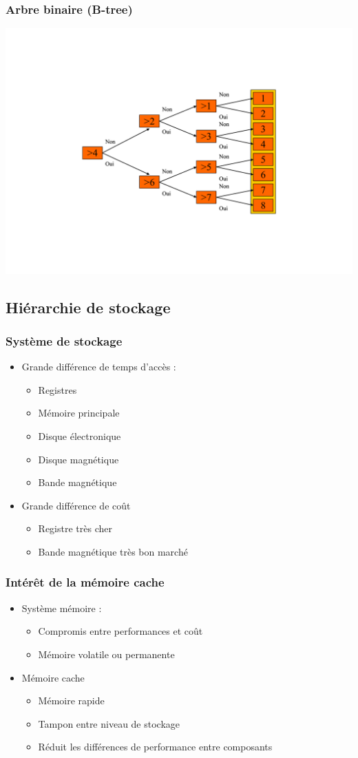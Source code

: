 \begin{frame}
\frametitle{Arbre binaire (B-tree)}
\includegraphics[width=.8\textwidth]{../illustration/b-tree.pdf}
\end{frame}


\subsection{Hiérarchie de stockage} 

\begin{frame}
\frametitle{Système de stockage}
\begin{itemize}
\item Grande différence de temps d’accès :
\begin{itemize}
\item Registres
\item Mémoire principale
\item Disque électronique
\item Disque magnétique
\item Bande magnétique
\end{itemize}
\item Grande différence de coût
\begin{itemize}
\item Registre très cher
\item Bande magnétique très bon marché
\end{itemize}
\end{itemize}
\end{frame}


\begin{frame}
\frametitle{Intérêt de la mémoire cache}
\begin{itemize}
\item Système mémoire :
\begin{itemize}
\item Compromis entre performances et coût
\item Mémoire volatile ou permanente
\end{itemize}
\item Mémoire cache
\begin{itemize}
\item Mémoire rapide
\item Tampon entre niveau de stockage
\item Réduit les différences de performance entre composants
\end{itemize}
\end{itemize}
\end{frame}


